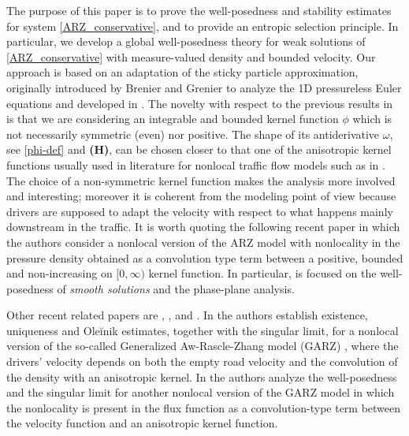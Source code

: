 \documentclass[11pt,a4paper,oneside]{amsart}
\begin{document}
The purpose of this paper is to prove the well-posedness and stability estimates for system \eqref{ARZ_conservative}, and to provide an entropic selection principle. 
In particular, we develop a global well-posedness theory for weak solutions of \eqref{ARZ_conservative} with measure-valued density and bounded velocity. 
Our approach is based on an adaptation of the sticky particle approximation, originally introduced by Brenier and Grenier \cite{Brenier-Grenier} to analyze 
the 1D pressureless Euler equations and developed in \cite{Leslie-Tan}. 
The novelty with respect to the previous results in \cite{Leslie-Tan} is that we are considering an integrable and bounded kernel function $\phi$ which is not necessarily symmetric (even) nor positive. The shape of its antiderivative $\omega$, see \eqref{phi-def} and  \textbf{(H)}, can be chosen closer to that one of the anisotropic kernel functions usually used in literature for nonlocal traffic flow models such as in \cite{chiarello, chiarello2020micro, ChiarelloGoatin}.\\ 
The choice of a non-symmetric kernel function makes the analysis more involved and interesting; 
moreover it is coherent from the modeling point of view because drivers are supposed to adapt the velocity with respect to what happens 
mainly downstream in the traffic. It is worth quoting the following recent paper \cite{HT2024} in which the authors consider a nonlocal version 
of the ARZ model with nonlocality in the pressure density obtained as a convolution type term between a positive, bounded and non-increasing 
on $[0,\infty)$ kernel function. In particular, \cite{HT2024} is focused on the well-posedness of \textit{smooth solutions} and the phase-plane analysis.

{Other recent related papers are \cite{ACCGK2025}, \cite{CPSZ2024}, \cite{MarconiSpinolo2025} and \cite{WZ2025}.} In \cite{MarconiSpinolo2025} the authors establish existence, uniqueness 
and Ole\u{i}nik estimates, together with the singular limit, for a nonlocal version of the so-called Generalized Aw-Rascle-Zhang model (GARZ) \cite{FanHerty2014}, 
where the drivers' velocity depends on both the empty road velocity and the convolution of the density with an anisotropic kernel. 
In \cite{ACCGK2025} the authors analyze the well-posedness and the singular limit for another nonlocal version of the GARZ model 
in which the nonlocality is present in the flux function as a convolution-type term between the velocity function and an anisotropic kernel function.
\end{document}
